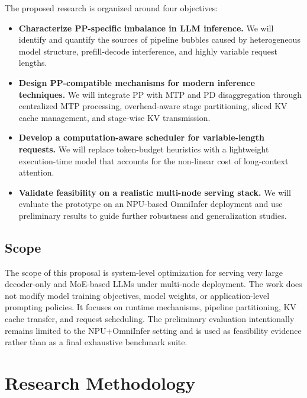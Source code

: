 \documentclass[12pt,a4paper]{article}
\begin{document}
The proposed research is organized around four objectives:
\begin{itemize}
    \item \textbf{Characterize PP-specific imbalance in LLM inference.}
    We will identify and quantify the sources of pipeline bubbles caused by heterogeneous model structure, prefill-decode interference, and highly variable request lengths.

    \item \textbf{Design PP-compatible mechanisms for modern inference techniques.}
    We will integrate PP with MTP and PD disaggregation through centralized MTP processing, overhead-aware stage partitioning, sliced KV cache management, and stage-wise KV transmission.

    \item \textbf{Develop a computation-aware scheduler for variable-length requests.}
    We will replace token-budget heuristics with a lightweight execution-time model that accounts for the non-linear cost of long-context attention.

    \item \textbf{Validate feasibility on a realistic multi-node serving stack.}
    We will evaluate the prototype on an NPU-based OmniInfer deployment and use preliminary results to guide further robustness and generalization studies.
\end{itemize}

\subsection{Scope}

The scope of this proposal is system-level optimization for serving very large decoder-only and MoE-based LLMs under multi-node deployment.
The work does not modify model training objectives, model weights, or application-level prompting policies.
It focuses on runtime mechanisms, pipeline partitioning, KV cache transfer, and request scheduling.
The preliminary evaluation intentionally remains limited to the NPU+OmniInfer setting and is used as feasibility evidence rather than as a final exhaustive benchmark suite.

\section{Research Methodology}
\end{document}
